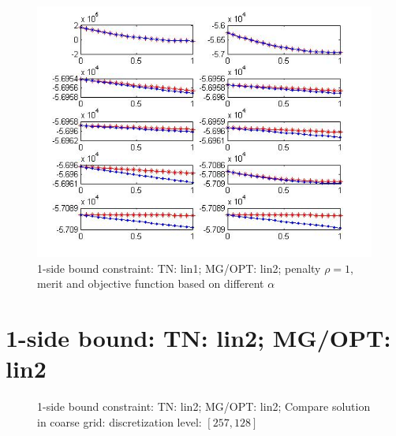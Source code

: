 \documentclass[10pt]{article}
\begin{document}
 
\begin{figure}
  \centering
  \includegraphics[width=1\textwidth]{merit1s12}
  \caption{1-side bound constraint: TN: lin1; MG/OPT: lin2;  penalty $\rho=1$, merit and objective function based on different $\alpha$}
  \label{fig:merit12}
\end{figure}

\section{1-side bound: TN: lin2; MG/OPT: lin2}

\begin{figure}[H]
  \centering
  \caption{1-side bound constraint:  TN: lin2; MG/OPT: lin2; Compare solution in coarse grid: discretization level: $[257,128]$}
  \label{fig:coarse1s22}
\end{figure}
\end{document}
